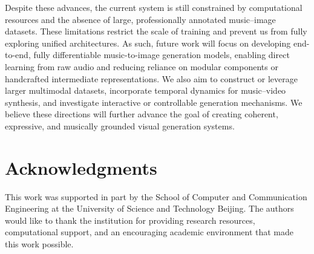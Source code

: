 \documentclass[letterpaper]{article}
\begin{document}
Despite these advances, the current system is still constrained by computational resources and the absence of large, professionally annotated music–image datasets. These limitations restrict the scale of training and prevent us from fully exploring unified architectures. As such, future work will focus on developing end-to-end, fully differentiable music-to-image generation models, enabling direct learning from raw audio and reducing reliance on modular components or handcrafted intermediate representations. We also aim to construct or leverage larger multimodal datasets, incorporate temporal dynamics for music–video synthesis, and investigate interactive or controllable generation mechanisms. We believe these directions will further advance the goal of creating coherent, expressive, and musically grounded visual generation systems.

\section{Acknowledgments}
This work was supported in part by the School of Computer and Communication Engineering at the University of Science and Technology Beijing. The authors would like to thank the institution for providing research resources, computational support, and an encouraging academic environment that made this work possible.

\clearpage



\bigskip
\end{document}

